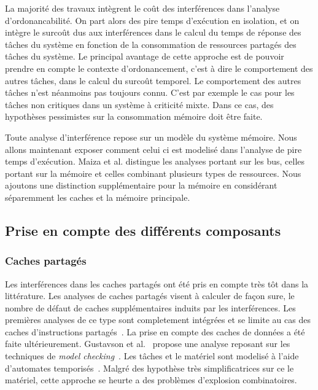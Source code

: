 La majorité des travaux intègrent le coût des interférences dans l'analyse d'ordonancabilité.
On part alors des pire temps d'exécution en isolation, et on intègre le surcoût dus aux interférences dans le calcul du temps de réponse des tâches du système en fonction de la consommation de ressources partagés des tâches du système.
Le principal avantage de cette approche est de pouvoir prendre en compte le contexte d'ordonancement, c'est à dire le comportement des autres tâches, dans le calcul du surcoût temporel.
Le comportement des autres tâches n'est néanmoins pas toujours connu.
C'est par exemple le cas pour les tâches non critiques dans un système à criticité mixte.
Dans ce cas, des hypothèses pessimistes sur la consommation mémoire doit être faite.

Toute analyse d'interférence repose sur un modèle du système mémoire.
Nous allons maintenant exposer comment celui ci est modelisé dans l'analyse de pire temps d'exécution.
Maiza et al. distingue les analyses portant sur les bus, celles portant sur la mémoire et celles combinant plusieurs types de ressources.
Nous ajoutons une distinction supplémentaire pour la mémoire en considérant séparemment les caches et la mémoire principale.

\subsection{Prise en compte des différents composants}
\subsubsection{Caches partagés}

Les interférences dans les caches partagés ont été pris en compte très tôt dans la littérature.
Les analyses de caches partagés visent à calculer de façon sure, le nombre de défaut de caches supplémentaires induits par les interférences.
Les premières analyses de ce type sont completement intégrées et se limite au cas des caches d'instructions partagés~\cite{2008_Yan_WCET_analysis_for_Multi_Core_processors_with_shared_L2_instruction_caches,2009_hardy_using_bypass_to_tighten_WCET_estimates_for_Multi_Core_processors_with_shared_instruction_caches,2009_Li_Timing_analysis_of_concurrent_programs_running_on_shared_cache_Multi_Cores,zhang2009accurately}.
La prise en compte des caches de données a été faite ultérieurement.
Gustavson et al.~\cite{2010_Gustavsson_towards_WCET_analysis_of_multicore_architectures_using_UPPAAL} propose une analyse reposant sur les techniques de \emph{model checking}~\cite{}.
Les tâches et le matériel sont modelisé à l'aide d'automates temporisés~\cite{}.
Malgré des hypothèse très simplificatrices sur ce le matériel, cette approche se heurte a des problèmes d'explosion combinatoires.

